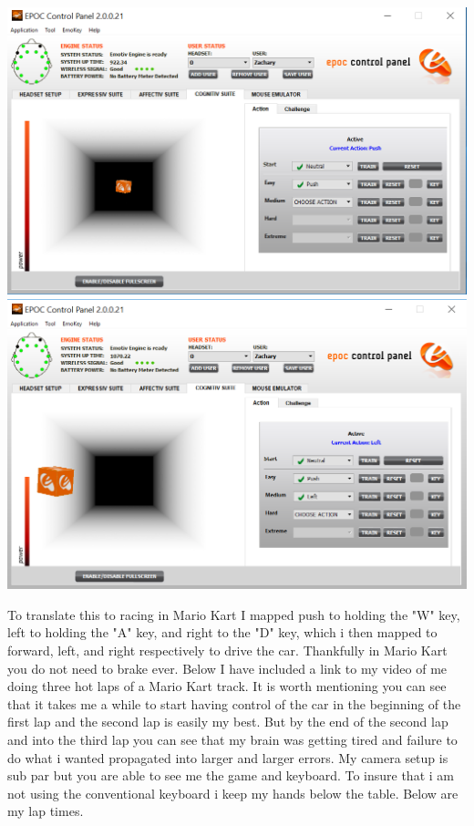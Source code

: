 \documentclass[12pt]{article}
\begin{document}
 				\begin{center}
					\includegraphics[scale=0.4]{push.png}\\
					\vspace{2mm}
					\includegraphics[scale=0.4]{left.png}\\
 				\end{center}

 				To translate this to racing in Mario Kart I mapped push to holding the "W" key, left 
 				to holding the "A" key, and right to the "D" key, which i then mapped to forward, 
 				left, and right respectively to drive the car.  Thankfully in Mario Kart you do not 
 				need to brake ever.  Below I have included a link to my video of me doing three hot 
 				laps of a Mario Kart track.  It is worth mentioning you can see that it takes me a 
 				while to start having control of the car in the beginning of the first lap and the second lap is easily my best. But by the end of the second lap and into the third 
 				lap you can see that my brain was getting tired and failure to do what i wanted 
 				propagated into larger and larger errors.  My camera setup is sub par but you are 
 				able to see me the game and keyboard.  To insure that i am not using the
 				conventional keyboard i keep my hands below the table.  Below are my lap times.
\end{document}
